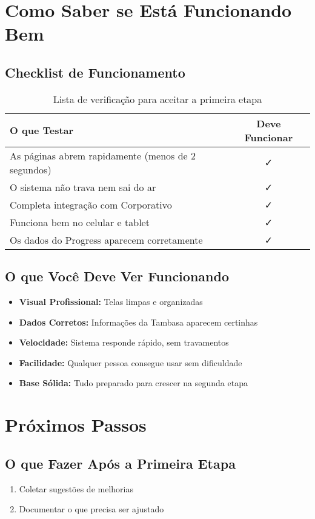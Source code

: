 \documentclass[12pt,a4paper]{article}
\begin{document}
\section{Como Saber se Está Funcionando Bem}

\subsection{Checklist de Funcionamento}
\begin{table}[H]
    \centering
    \begin{tabularx}{\textwidth}{|X|c|}
        \hline
        \textbf{O que Testar} & \textbf{Deve Funcionar} \\
        \hline
        As páginas abrem rapidamente (menos de 2 segundos) & ✓ \\
        O sistema não trava nem sai do ar & ✓ \\
        Completa integração com Corporativo & ✓ \\
        Funciona bem no celular e tablet & ✓ \\
        Os dados do Progress aparecem corretamente & ✓ \\
        \hline
    \end{tabularx}
    \caption{Lista de verificação para aceitar a primeira etapa}
\end{table}

\subsection{O que Você Deve Ver Funcionando}
\begin{itemize}
    \item \textbf{Visual Profissional:} Telas limpas e organizadas
    \item \textbf{Dados Corretos:} Informações da Tambasa aparecem certinhas
    \item \textbf{Velocidade:} Sistema responde rápido, sem travamentos
    \item \textbf{Facilidade:} Qualquer pessoa consegue usar sem dificuldade
    \item \textbf{Base Sólida:} Tudo preparado para crescer na segunda etapa
\end{itemize}

\section{Próximos Passos}

\subsection{O que Fazer Após a Primeira Etapa}
\begin{enumerate}
    \item Coletar sugestões de melhorias
    \item Documentar o que precisa ser ajustado
\end{enumerate}
\end{document}
